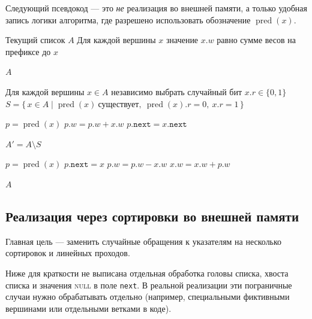 	Следующий псевдокод --- это \emph{не} реализация во внешней памяти, а только удобная запись логики алгоритма, где разрешено использовать обозначение $\operatorname{pred}(x)$.
	
	\begin{algorithm}[H]
		\caption{\textsc{PrefixSums-Conceptual}$(A)$}
		\begin{algorithmic}[1]
			\Require Текущий список $A$
			\Ensure Для каждой вершины $x$ значение $x.w$ равно сумме весов на префиксе до $x$
			
			\State \Return $A$
			\EndIf
			
			\State Для каждой вершины $x \in A$ независимо выбрать случайный бит $x.r \in \{0,1\}$
			\State $S = \{\, x \in A \mid \operatorname{pred}(x)\ \text{существует},\ \operatorname{pred}(x).r = 0,\ x.r = 1 \,\}$
			
			\State $p = \operatorname{pred}(x)$
			\State $p.w = p.w + x.w$
			\State $p.\texttt{next} = x.\texttt{next}$
			\EndFor
			
			\State $A' = A \setminus S$
			\State {}
			
			\State $p = \operatorname{pred}(x)$
			\State $p.\texttt{next} = x$
			\State $p.w = p.w - x.w$ 
			\State $x.w = x.w + p.w$ 
			\EndFor
			
			\State \Return $A$
		\end{algorithmic}
	\end{algorithm}
	
	\subsection{Реализация через сортировки во внешней памяти}
	
	Главная цель --- заменить случайные обращения к указателям на несколько сортировок и линейных проходов.
	
	\begin{Remark}{}{}
		Ниже для краткости не выписана отдельная обработка головы списка, хвоста списка и значения \textsc{null} в поле \texttt{next}.
		В реальной реализации эти пограничные случаи нужно обрабатывать отдельно
		(например, специальными фиктивными вершинами или отдельными ветками в коде).
	\end{Remark}
